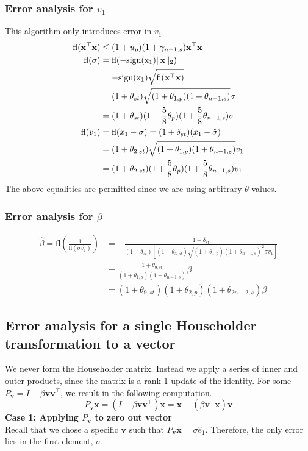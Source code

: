 \documentclass{article}
\newcommand{\dd}{\delta}
\newcommand{\tth}{\theta}
\newcommand{\bb}[1]{\mathbf{#1}}
\newcommand{\fl}{\mathrm{fl}}
\theoremstyle{definition}
\begin{document}
\subsubsection{Error analysis for $v_1$}
This algorithm only introduces error in $v_1$. 
\begin{align*}
    \fl(\bb{x}^{\top}\bb{x}) &\leq (1+u_p)(1+\gamma_{n-1,s})\bb{x}^{\top}\bb{x} \\
    \fl(\sigma) &= \fl(-\rm{sign}(x_1)\|\bb{x}\|_2)\\
    &= -\rm{sign}(x_1)\sqrt{\fl(\bb{x}^{\top}\bb{x})}\\
    &= (1+\tth_{st})\sqrt{(1+\tth_{1,p})(1+\tth_{n-1,s})} \sigma\\
    &= (1+\tth_{st})(1+\frac{5}{8}\tth_p)(1+\frac{5}{8}\tth_{n-1,s})\sigma\\
    \fl(v_1) &= \fl(x_1-\sigma) = (1+\dd_{st})(x_1-\hat{\sigma})\\
    &=(1+\tth_{2,st})\sqrt{(1+\tth_{1,p})(1+\tth_{n-1,s})}v_1\\
    &=(1+\tth_{2,st})(1+\frac{5}{8}\tth_p)(1+\frac{5}{8}\tth_{n-1,s})v_1\\
\end{align*}
The above equalities are permitted since we are using arbitrary $\tth$ values.

\subsubsection{Error analysis for $\beta$}
\begin{align*}
    \hat{\beta} = \fl(\frac{1}{\fl(\hat{\sigma}\hat{v_1})}) &= -\frac{1+\dd_{st}}{(1+\dd_{st})\left[(1+\tth_{3,st})\sqrt{(1+\tth_{1,p})(1+\tth_{n-1,s})}^2\sigma v_1\right]}\\
    &= \frac{1+\tth_{9,st}}{(1+\tth_{1,p})(1+\tth_{n-1,s})}\beta\\
    &= (1+\tth_{9, st})(1+\tth_{2,p})(1+\tth_{2n-2,s})\beta
\end{align*}

\subsection{Error analysis for a single Householder transformation to a vector}
We never form the Householder matrix. 
Instead we apply a series of inner and outer products, since the matrix is a rank-1 update of the identity. 
For some $P_{\bb{v}}=I-\beta \bb{v}\bb{v}^{\top}$, we result in the following computation.
\begin{equation}
    P_{\bb{v}} \bb{x} = (I-\beta \bb{v}\bb{v}^{\top})\bb{x} = \bb{x} - (\beta \bb{v}^{\top}\bb{x})\bb{v}
\end{equation}
\textbf{Case 1: Applying $P_{\bb{v}}$ to zero out vector}\\ 
Recall that we chose a specific $\bb{v}$ such that $P_{\bb{v}}\bb{x} = \sigma \hat{e}_1$. Therefore, the only error lies in the first element, $\sigma$. 
\end{document}
